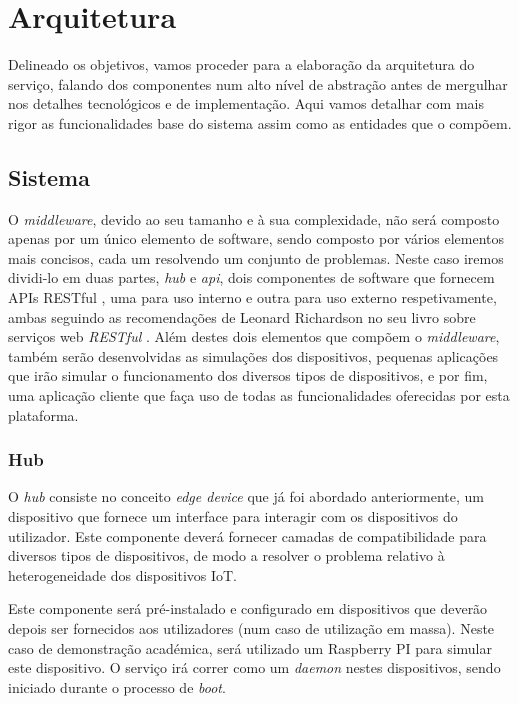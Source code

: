 \chapter{Arquitetura}

Delineado os objetivos, vamos proceder para a elaboração da arquitetura do serviço, falando dos componentes num alto nível de abstração antes de mergulhar nos detalhes tecnológicos e de implementação. Aqui vamos detalhar com mais rigor as funcionalidades base do sistema assim como as entidades que o compõem.

\section{Sistema}

O \textit{middleware}, devido ao seu tamanho e à sua complexidade, não será composto apenas por um único elemento de software, sendo composto por vários elementos mais concisos, cada um resolvendo um conjunto de problemas. Neste caso iremos dividi-lo em duas partes, \textit{hub} e \textit{api}, dois componentes de software que fornecem APIs RESTful , uma para uso interno e outra para uso externo respetivamente, ambas seguindo as recomendações de Leonard Richardson no seu livro sobre serviços web \textit{RESTful} \cite{richardson2013restful}. Além destes dois elementos que compõem o \textit{middleware}, também serão desenvolvidas as simulações dos dispositivos, pequenas aplicações que irão simular o funcionamento dos diversos tipos de dispositivos, e por fim, uma aplicação cliente que faça uso de todas as funcionalidades oferecidas por esta plataforma.

\subsection{Hub}

O \textit{hub} consiste no conceito \textit{edge device} que já foi abordado anteriormente, um dispositivo que fornece um interface para interagir com os dispositivos do utilizador. Este componente deverá fornecer camadas de compatibilidade para diversos tipos de dispositivos, de modo a resolver o problema relativo à heterogeneidade dos dispositivos IoT. 

Este componente será pré-instalado e configurado em dispositivos que deverão depois ser fornecidos aos utilizadores (num caso de utilização em massa). Neste caso de demonstração académica, será utilizado um Raspberry PI para simular este dispositivo. O serviço irá correr como um \textit{daemon} nestes dispositivos, sendo iniciado durante o processo de \textit{boot}.

